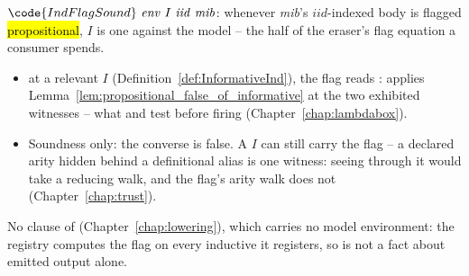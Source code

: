 \begin{definition}
\label{def:IndFlagSound}
\leanok
{}
 $\code{IndFlagSound}\ \mathit{env}\ I\ \mathit{iid}\ \mathit{mib}$: whenever
\emph{mib}'s $\mathit{iid}$-indexed body is flagged \hl{propositional}, $I$ is one against the
model -- the half of the eraser's flag equation a consumer spends.
\begin{itemize}
\item {} at a relevant $I$ (Definition~\ref{def:InformativeInd}), the flag reads
:  applies Lemma~\ref{lem:propositional_false_of_informative}
at the two exhibited witnesses -- what  and  test
before firing (Chapter~\ref{chap:lambdabox}).
\item {} Soundness only: the converse is false. A  $I$
can still carry the flag  -- a declared arity hidden behind a definitional alias is
one witness: seeing through it would take a reducing walk, and the flag's arity walk does not
(Chapter~\ref{chap:trust}).
\end{itemize}
 No clause of  (Chapter~\ref{chap:lowering}), which carries no model
environment: the registry computes the flag on every inductive it registers, so 
is not a fact about emitted output alone.
\end{definition}

